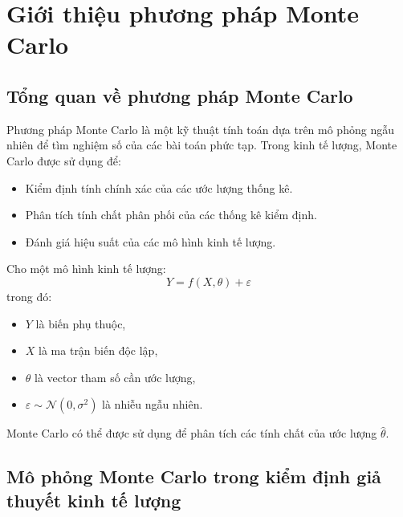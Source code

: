 \chapter{Giới thiệu phương pháp Monte Carlo}
\section{Tổng quan về phương pháp Monte Carlo}
Phương pháp Monte Carlo là một kỹ thuật tính toán dựa trên mô phỏng ngẫu nhiên để tìm nghiệm số của các bài toán phức tạp. Trong kinh tế lượng, Monte Carlo được sử dụng để:
\begin{itemize}
    \item Kiểm định tính chính xác của các ước lượng thống kê.
    \item Phân tích tính chất phân phối của các thống kê kiểm định.
    \item Đánh giá hiệu suất của các mô hình kinh tế lượng.
\end{itemize}

Cho một mô hình kinh tế lượng:
\begin{equation}
    Y = f(X, \theta) + \varepsilon
\end{equation}
trong đó:
\begin{itemize}
    \item $Y$ là biến phụ thuộc,
    \item $X$ là ma trận biến độc lập,
    \item $\theta$ là vector tham số cần ước lượng,
    \item $\varepsilon \sim \mathcal{N}(0, \sigma^2)$ là nhiễu ngẫu nhiên.
\end{itemize}
Monte Carlo có thể được sử dụng để phân tích các tính chất của ước lượng $\hat{\theta}$.



\section{Mô phỏng Monte Carlo trong kiểm định giả thuyết kinh tế lượng}
